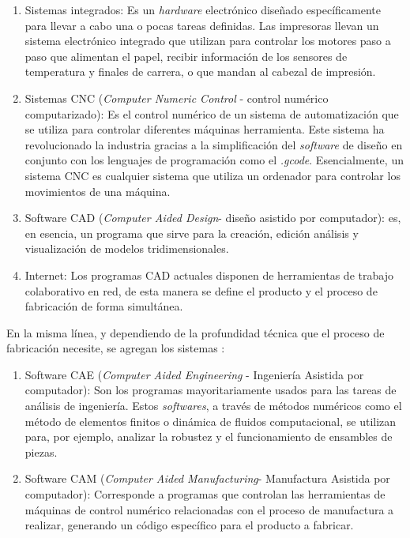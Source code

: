  \begin{enumerate}
 	
	\item Sistemas integrados: Es un \textit{hardware} electrónico diseñado específicamente para llevar a cabo una o pocas tareas definidas. Las impresoras llevan un sistema electrónico integrado que utilizan para controlar los motores paso a paso que alimentan el papel, recibir información de los sensores de temperatura y finales de carrera, o que mandan al cabezal de impresión.
	\item Sistemas CNC (\textit{Computer Numeric Control} - control numérico computarizado): Es el control numérico de un sistema de automatización que se utiliza para controlar diferentes máquinas herramienta. Este sistema ha revolucionado la industria gracias a la simplificación del \textit{software} de diseño en conjunto con los lenguajes de programación como el \textit{.gcode}. Esencialmente, un sistema CNC es cualquier sistema que utiliza un ordenador para controlar los movimientos de una máquina.
	\item Software CAD (\textit{Computer Aided Design}- diseño asistido por computador): es, en esencia, un programa que sirve para la creación, edición análisis y visualización de modelos tridimensionales.  
	\item Internet: Los programas CAD actuales disponen de herramientas de trabajo colaborativo en red, de esta manera se define el producto y el proceso de fabricación de forma simultánea.\\

  \end{enumerate}

En la misma línea, y dependiendo de la profundidad técnica que el proceso de fabricación necesite, se agregan los sistemas \citep{leao2017}:

\begin{enumerate}
	\item Software CAE (\textit{Computer Aided Engineering} - Ingeniería Asistida por computador): Son los programas mayoritariamente usados para las tareas de análisis de ingeniería. Estos \textit{softwares}, a través de métodos numéricos como el método de elementos finitos o dinámica de fluidos computacional, se utilizan para, por ejemplo, analizar la robustez y el funcionamiento de ensambles de piezas.
	\item Software CAM (\textit{Computer Aided Manufacturing}- Manufactura Asistida por computador): Corresponde a programas que controlan las herramientas de máquinas de control numérico relacionadas con el proceso de manufactura a realizar, generando un código específico para el producto a fabricar. 

\end{enumerate}



